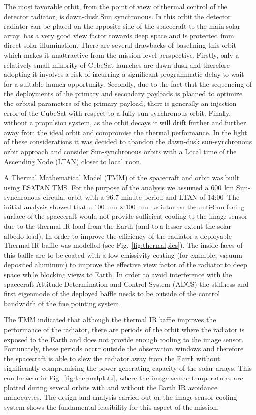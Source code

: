 \documentclass[]{iac}
\begin{document}
The most favorable orbit, from the point of view of thermal control of the detector radiator, is dawn-dusk Sun
synchronous. In this orbit the detector radiator can be placed on the opposite side of the spacecraft to the main solar
array. has a very good view factor towards deep space and is protected from direct solar illumination. There are several
drawbacks of baselining this orbit which makes it unattractive from the mission level perspective. Firstly, only a
relatively small minority of CubeSat launches are dawn-dusk and therefore adopting it involves a risk of incurring a
significant programmatic delay to wait for a suitable launch opportunity. Secondly, due to the fact that the sequencing
of the deployments of the primary and secondary payloads is planned to optimize the orbital parameters of the primary
payload, there is generally an injection error of the CubeSat with respect to a fully sun synchronous orbit. Finally,
without a propulsion system, as the orbit decays it will drift further and further away from the ideal orbit and
compromise the thermal performance. In the light of these considerations it was decided to abandon the dawn-dusk
sun-synchronous orbit approach and consider Sun-synchronous orbits with a Local time of the Ascending Node (LTAN) closer
to local noon.

A Thermal Mathematical Model (TMM) of the spacecraft and orbit was built using ESATAN TMS. For the purpose of the
analysis we assumed a \SI{600}{\kilo\metre} Sun-synchronous circular orbit with a 96.7 minute period and LTAN of 14:00.
The initial analysis showed that a $\SI{100}{\milli\metre} \times \SI{100}{\milli\metre}$ radiator on the anti-Sun
facing surface of the spacecraft would not provide sufficient cooling to the image sensor due to the thermal IR load
from the Earth (and to a lesser extent the solar albedo load). In order to improve the efficiency of the radiator a
deployable Thermal IR baffle was modelled (see Fig.~\ref{fig:thermalpics}). The inside faces of this baffle are to be
coated with a low-emissivity coating (for example, vacuum deposited aluminum) to improve the effective view factor of
the radiator to deep space while blocking views to Earth. In order to avoid interference with the spacecraft Attitude
Determination and Control System (ADCS) the stiffness and first eigenmode of the deployed baffle needs to be outside of
the control bandwidth of the fine pointing system.

The TMM indicated that although the thermal IR baffle improves the performance of the radiator, there are periods of the
orbit where the radiator is exposed to the Earth and does not provide enough cooling to the image sensor. Fortunately,
these periods occur outside the observation windows and therefore the spacecraft is able to slew the radiator away from
the Earth without significantly compromising the power generating capacity of the solar arrays. This can be seen in
Fig.~\ref{fig:thermalplots}, where the image sensor temperatures are plotted during several orbits with and without the
Earth IR avoidance manoeuvres. The design and analysis carried out on the image sensor cooling system shows the
fundamental feasibility for this aspect of the mission.
\end{document}
